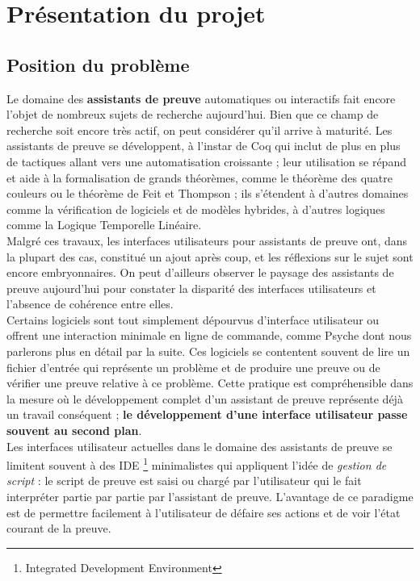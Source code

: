 \section{Présentation du projet}

\subsection{Position du problème}

Le domaine des \textbf{assistants de preuve} automatiques ou interactifs fait encore l'objet de nombreux sujets de recherche aujourd'hui. Bien que ce champ de recherche soit encore très actif, on peut considérer qu'il arrive à maturité. Les assistants de preuve se développent, à l'instar de Coq qui inclut de plus en plus de tactiques allant vers une automatisation croissante ; leur utilisation se répand et aide à la formalisation de grands théorèmes, comme le théorème des quatre couleurs ou le théorème de Feit et Thompson ; ils s'étendent à d'autres domaines comme la vérification de logiciels et de modèles hybrides, à d'autres logiques comme la Logique Temporelle Linéaire.\\

Malgré ces travaux, les interfaces utilisateurs pour assistants de preuve ont, dans la plupart des cas, constitué un ajout après coup, et les réflexions sur le sujet sont encore embryonnaires. On peut d'ailleurs observer le paysage des assistants de preuve aujourd'hui pour constater la disparité des interfaces utilisateurs et l'absence de cohérence entre elles.\\

Certains logiciels sont tout simplement dépourvus d'interface utilisateur ou offrent une interaction minimale en ligne de commande, comme Psyche dont nous parlerons plus en détail par la suite. Ces logiciels se contentent souvent de lire un fichier d'entrée qui représente un problème et de produire une preuve ou de vérifier une preuve relative à ce problème. Cette pratique est compréhensible dans la mesure où le développement complet d'un assistant de preuve représente déjà un travail conséquent ; \textbf{le développement d'une interface utilisateur passe souvent au second plan}.\\

Les interfaces utilisateur actuelles dans le domaine des assistants de preuve se limitent souvent à des IDE \footnote{Integrated Development Environment} minimalistes qui appliquent l'idée de \textit{gestion de script} : le script de preuve est saisi ou chargé par l'utilisateur qui le fait interpréter partie par partie par l'assistant de preuve. L'avantage de ce paradigme est de permettre facilement à l'utilisateur de défaire ses actions et de voir l'état courant de la preuve.\\

